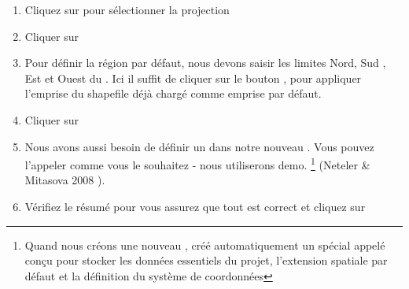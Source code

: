 \begin{enumerate}
  \item Cliquez sur  pour sélectionner la projection
  \item Cliquer sur 
  \item Pour définir la région par défaut, nous devons saisir les limites Nord, Sud , Est et Ouest du . Ici il suffit de cliquer sur le bouton , pour appliquer l'emprise du shapefile  déjà chargé comme emprise par défaut.
  \item Cliquer sur 
    \item Nous avons aussi besoin de définir un  dans notre nouveau . Vous pouvez l'appeler comme vous le souhaitez - nous utiliserons demo. \footnote{Quand nous créons une nouveau , \grass créé automatiquement un  spécial appelé  conçu pour stocker les données essentiels du projet, l'extension spatiale par défaut et la définition du système de coordonnées} (Neteler \& Mitasova 2008  \parencite{neteler_mitasova08}).
  \item Vérifiez le résumé pour vous assurez que tout est correct et cliquez sur 

\end{enumerate}
